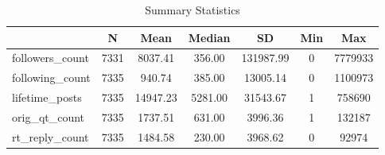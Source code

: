 \begin{table}[htbp]\centering
\def\sym#1{\ifmmode^{#1}\else\(^{#1}\)\fi}
\caption{Summary Statistics}
\begin{tabular}{l*{1}{cccccc}}
\toprule
            &           N&        Mean&      Median&          SD&         Min&         Max\\
\midrule
followers\_count&        7331&     8037.41&      356.00&   131987.99&           0&     7779933\\
following\_count&        7335&      940.74&      385.00&    13005.14&           0&     1100973\\
lifetime\_posts&        7335&    14947.23&     5281.00&    31543.67&           1&      758690\\
orig\_qt\_count&        7335&     1737.51&      631.00&     3996.36&           1&      132187\\
rt\_reply\_count&        7335&     1484.58&      230.00&     3968.62&           0&       92974\\
\bottomrule
\end{tabular}
\end{table}
